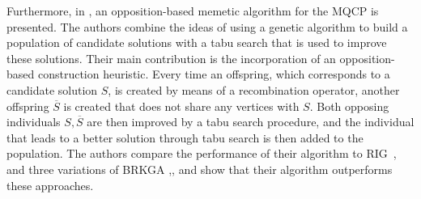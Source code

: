 \documentclass[draft,final]{vutinfth} %
\begin{document}
Furthermore, in \cite{zhou_opposition-based_2020}, an opposition-based memetic algorithm for the MQCP is presented. The authors combine the ideas of using a genetic algorithm to build a population of candidate solutions with a tabu search that is used to improve these solutions. Their main contribution is the incorporation of an opposition-based construction heuristic. Every time an offspring, which corresponds to a candidate solution $S$, is created by means of a recombination operator, another offspring $\overline{S}$ is created that does not share any vertices with $S$. Both opposing individuals $S, \overline{S}$ are then improved by a tabu search procedure, and the individual that leads to a better solution through tabu search is then added to the population. The authors compare the performance of their algorithm to RIG~\cite{oliveira2013construction}, and three variations of BRKGA \cite{pinto2015biased},\cite{pinto_biased_2018}, \cite{pinto2021brkga} and show that their algorithm outperforms these approaches.
\end{document}
